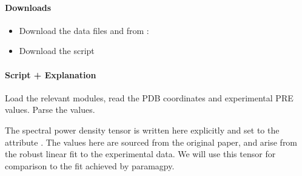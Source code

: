 \documentclass[a4paper,10pt,english,openany,oneside]{sphinxmanual}
\begin{document}
\paragraph{Downloads}
\label{\detokenize{examples/pre_fit_aniso_dipolar:downloads}}\begin{itemize}
\item {} 
\sphinxAtStartPar
Download the data files  and  from :

\item {} 
\sphinxAtStartPar
Download the script 

\end{itemize}


\paragraph{Script + Explanation}
\label{\detokenize{examples/pre_fit_aniso_dipolar:script-explanation}}
\sphinxAtStartPar
Load the relevant modules, read the PDB coordinates and experimental PRE values. Parse the values.

\begin{sphinxVerbatim}[commandchars=\\\{\}]
      
     
   

  
  
  
\end{sphinxVerbatim}

\sphinxAtStartPar
The spectral power density tensor is written here explicitly and set to the attribute . The values here are sourced from the original paper, and arise from the robust linear fit to the experimental data. We will use this tensor for comparison to the fit achieved by paramagpy.
\end{document}
